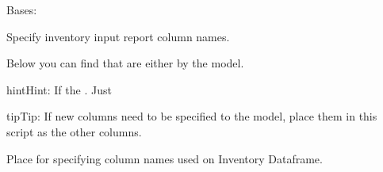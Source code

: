 \documentclass[letterpaper,10pt,english]{sphinxmanual}
\begin{document}
\begin{fulllineitems}
\label{\detokenize{source/optimization:optimization.constants.Columns}}
Bases: 

Specify inventory input report column names.

Below you can find  that are either  by the model.

\begin{sphinxadmonition}{hint}{Hint:}
If the .
Just 
\end{sphinxadmonition}

\begin{sphinxadmonition}{tip}{Tip:}
If new columns need to be specified to the model, place them in this script as the other columns.

Place for specifying column names used on Inventory Dataframe.
\end{sphinxadmonition}

\begin{fulllineitems}
\label{\detokenize{source/optimization:optimization.constants.Columns.average_item_daily_use}}
\end{fulllineitems}


\begin{fulllineitems}
\label{\detokenize{source/optimization:optimization.constants.Columns.bu_address}}
\end{fulllineitems}



\end{fulllineitems}
\end{document}
